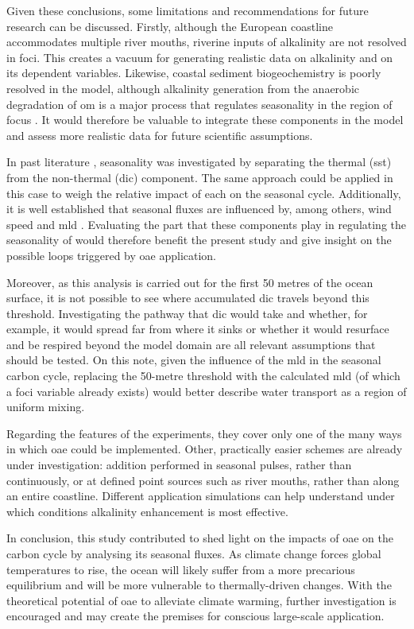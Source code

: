 Given these conclusions, some limitations and recommendations for future research can be discussed. Firstly, although the European coastline accommodates multiple river mouths, riverine inputs of alkalinity are not resolved in \ac{foci}. This creates a vacuum for generating realistic data on alkalinity and on its dependent variables. Likewise, coastal sediment biogeochemistry is poorly resolved in the model, although alkalinity generation from the anaerobic degradation of \ac{om} is a major process that regulates seasonality in the region of focus \citep{thomas2009enhanced}. It would therefore be valuable to integrate these components in the model and assess more realistic data for future scientific assumptions. 

In past literature \citep{schwinger2022report, fassbender2022quantifying},  seasonality was investigated by separating the thermal (\ac{sst}) from the non-thermal (\ac{dic}) component. The same approach could be applied in this case to weigh the relative impact of each on the seasonal  cycle. Additionally, it is well established that seasonal  fluxes are influenced by, among others, wind speed \citep{jones2014spatial} and \ac{mld} \citep{jo2022future, jones2014spatial}. Evaluating the part that these components play in regulating the seasonality of  would therefore benefit the present study and give insight on the possible loops triggered by \ac{oae} application.

Moreover, as this analysis is carried out for the first 50 metres of the ocean surface, it is not possible to see where accumulated \ac{dic} travels beyond this threshold. Investigating the pathway that \ac{dic} would take and whether, for example, it would spread far from where it sinks or whether it would resurface and be respired beyond the model domain are all relevant assumptions that should be tested. On this note, given the influence of the \ac{mld} in the seasonal carbon cycle, replacing the 50-metre threshold with the calculated \ac{mld} (of which a \ac{foci} variable already exists) would better describe water transport as a region of uniform mixing. 

Regarding the features of the experiments, they cover only one of the many ways in which \ac{oae} could be implemented. Other, practically easier schemes are already under investigation: addition performed in seasonal pulses, rather than continuously, or at defined point sources such as river mouths, rather than along an entire coastline. Different application simulations can help understand under which conditions alkalinity enhancement is most effective.

In conclusion, this study contributed to shed light on the impacts of \ac{oae} on the carbon cycle by analysing its seasonal fluxes. As climate change forces global temperatures to rise, the ocean will likely suffer from a more precarious equilibrium and will be more vulnerable to thermally-driven changes. With the theoretical potential of \ac{oae} to alleviate climate warming, further investigation is encouraged and may create the premises for conscious large-scale application. 
